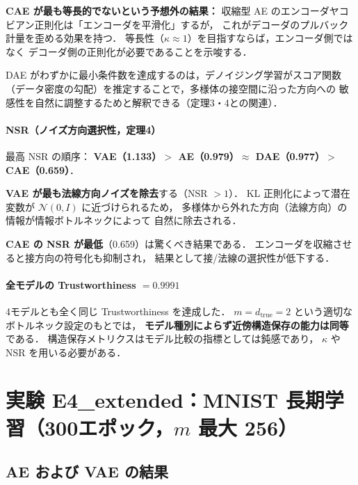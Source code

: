 \documentclass[12pt,a4paper]{ltjsarticle}  %
\newcommand{\dtrue}{d_{\mathrm{true}}}
\begin{document}
\textbf{CAE が最も等長的でないという予想外の結果：}
収縮型 AE のエンコーダヤコビアン正則化は「エンコーダを平滑化」するが，
これがデコーダのプルバック計量を歪める効果を持つ．
等長性（$\kappa \approx 1$）を目指すならば，エンコーダ側ではなく
デコーダ側の正則化が必要であることを示唆する．

DAE がわずかに最小条件数を達成するのは，デノイジング学習がスコア関数
（データ密度の勾配）を推定することで，多様体の接空間に沿った方向への
敏感性を自然に調整するためと解釈できる（定理3・4との関連）．

\paragraph{NSR（ノイズ方向選択性，定理4）}
最高 NSR の順序：
\textbf{VAE（1.133）$>$ AE（0.979）$\approx$ DAE（0.977）$>$ CAE（0.659）}．

\textbf{VAE が最も法線方向ノイズを除去}する（NSR $> 1$）．
KL 正則化によって潜在変数が $\mathcal{N}(0, I)$ に近づけられるため，
多様体から外れた方向（法線方向）の情報が情報ボトルネックによって
自然に除去される．

\textbf{CAE の NSR が最低}（0.659）は驚くべき結果である．
エンコーダを収縮させると接方向の符号化も抑制され，
結果として接/法線の選択性が低下する．

\paragraph{全モデルの Trustworthiness $= 0.9991$}
4モデルとも全く同じ Trustworthiness を達成した．
$m = \dtrue = 2$ という適切なボトルネック設定のもとでは，
\textbf{モデル種別によらず近傍構造保存の能力は同等}である．
構造保存メトリクスはモデル比較の指標としては鈍感であり，
$\kappa$ や NSR を用いる必要がある．

\section{実験 E4\_extended：MNIST 長期学習（300エポック，$m$ 最大 256）}

\subsection{AE および VAE の結果}
\end{document}
